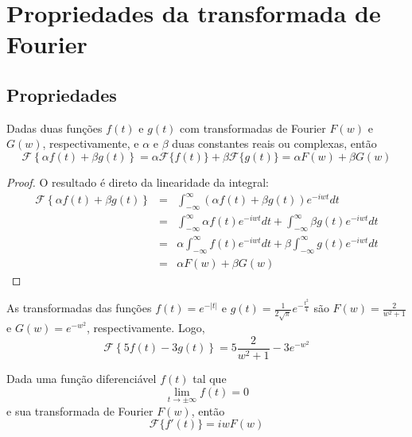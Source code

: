 \chapter{Propriedades da transformada de Fourier}
\section{Propriedades}
\begin{teo}\label{prop_linear}
Dadas duas funções $f(t)$ e $g(t)$ com transformadas de Fourier $F(w)$ e $G(w)$, respectivamente, e $\alpha$ e $\beta$ duas constantes reais ou complexas, então
\begin{equation}
\mathcal{F}\left\{\alpha f(t)+\beta g(t)\right\}=\alpha \mathcal{F}\{ f(t)\}+\beta\mathcal{F}\{ g(t)\}=\alpha F(w)+\beta G(w)
\end{equation}
\end{teo}
\begin{proof}
O resultado é direto da linearidade da integral:
\begin{eqnarray*}
\mathcal{F}\left\{\alpha f(t)+\beta g(t)\right\}&=&\int_{-\infty}^\infty \left(\alpha f(t)+\beta g(t)\right) e^{-iwt}dt \\
&=&\int_{-\infty}^\infty \alpha f(t)e^{-iwt}dt+\int_{-\infty}^\infty \beta g(t) e^{-iwt}dt \\
&=&\alpha\int_{-\infty}^\infty  f(t)e^{-iwt}dt+\beta\int_{-\infty}^\infty  g(t) e^{-iwt}dt \\
&=&\alpha F(w)+\beta G(w)
\end{eqnarray*}
\end{proof}
\begin{ex}As transformadas das funções $f(t)=e^{-|t|}$ e $g(t)=\frac{1}{2\sqrt{\pi}}e^{-\frac{t^2}{4}}$ são $F(w)=\frac{2}{w^2+1}$ e $G(w)=e^{-w^2}$, respectivamente. Logo,
\begin{equation}
\mathcal{F}\left\{5 f(t)-3 g(t)\right\}=5 \frac{2}{w^2+1}-3e^{-w^2}
\end{equation}
\end{ex}
\begin{teo}{\label{prop_der}} Dada uma função diferenciável $f(t)$ tal que 
\begin{equation}\lim_{t\to \pm \infty}f(t)=0
\end{equation}
e sua transformada de Fourier $F(w)$, então
\begin{equation}
\mathcal{F}\{f'(t)\}=iw F(w)
\end{equation}
\end{teo}
